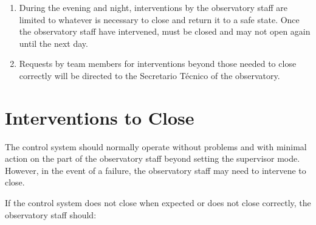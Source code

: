 \begin{enumerate}
\begin{enumerate}
            \item
                When the control system closes (at the end of the night, in response to weather conditions, or if the supervisor is forced to close), it switches the lights on for safety. At the end of the process, if the control system can determine that the enclosure closed correctly, it will switch the lights off. If it cannot, it will leave the lights switched on. Thus, if the lights are left on, this indicates that there was a problem during closing and the observatory staff should intervene as described in \S\ref{section:operations:interventions}.

            \item
                The observatory staff should report explicit changes to the supervisor state (e.g., use of the “Enable” and “Close” buttons) and any other relevant information in the Google chat.
        \end{enumerate}

        As their other duties permit, the observatory staff are encouraged to report other conditions or occurrences that might degrade the ability of the telescope to observe (e.g., failures of the control system or failures to focus) in the Google chat.

    \item
        During the evening and night, interventions by the observatory staff are limited to whatever is necessary to close {\projectname} and return it to a safe state. Once the observatory staff have intervened, {\projectname} must be closed and may not open again until the next day.

    \item
        Requests by team members for interventions beyond those needed to close {\projectname} correctly will be directed to the Secretario Técnico of the observatory.
\end{enumerate}

\section{Interventions to Close}
\label{section:operations:interventions}

The control system should normally operate without problems and with minimal action on the part of the observatory staff beyond setting the supervisor mode. However, in the event of a failure, the observatory staff may need to intervene to close.

If the control system does not close when expected or does not close correctly, the observatory staff should:

